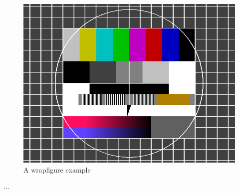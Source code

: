\clearpage
\begin{filecontents*}{\democodefile}
\begin{figure}
  \includegraphics[width=0.8\linewidth]{images/testimage.png}
  \caption{A wrapfigure example}
\end{figure}
...
\end{filecontents*}

